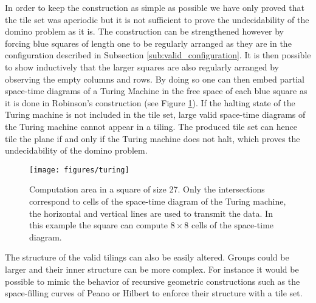\documentclass{jac}
\begin{document}
In order to keep the construction as simple as possible we have only proved that the tile set was aperiodic but it is not sufficient to prove the undecidability of the domino problem as it is. The construction can be strengthened however by forcing blue squares of length one to be regularly arranged as they are in the configuration described in Subsection \ref{sub:valid_configuration}. It is then possible to show inductively that the larger squares are also regularly arranged by observing the empty columns and rows. By doing so one can then embed partial space-time diagrams of a Turing Machine in the free space of each blue square as it is done in Robinson's construction (see Figure \ref{fig:turing}). If the halting state of the Turing machine is not included in the tile set, large valid space-time diagrams of the Turing machine cannot appear in a tiling. The produced tile set can hence tile the plane if and only if the Turing machine does not halt, which proves the undecidability of the domino problem.

\begin{figure}[htbp]
	\centering
	\texttt{[image: figures/turing]}
	\caption{Computation area in a square of size 27. Only the intersections correspond to cells of the space-time diagram of the Turing machine, the horizontal and vertical lines are used to transmit the data. In this example the square can compute $8\times 8$ cells of the space-time diagram.}
	\label{fig:turing}
\end{figure}

The structure of the valid tilings can also be easily altered. Groups could be larger and their inner structure can be more complex. For instance it would be possible to mimic the behavior of recursive geometric constructions such as the space-filling curves of Peano \cite{Peano1890} or Hilbert \cite{Hilbert1891} to enforce their structure with a tile set.




\end{document}
